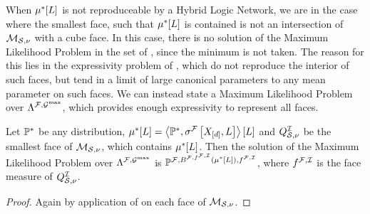 When $\mu^*[L]$ is not reproduceable by a Hybrid Logic Network, we are in the case where the smallest face, such that $\mu^*[L]$ is contained is not an intersection of $\mathcal{M}_{\mathcal{S},\nu}$ with a cube face.
In this case, there is no solution of the Maximum Likelihood Problem  in the set of \HybridLogicNetworks{}, since the minimum is not taken.
The reason for this lies in the expressivity problem of \HybridLogicNetworks{}, which do not reproduce the interior of such faces, but tend in a limit of large canonical parameters to any mean parameter on such faces.
We can instead state a Maximum Likelihood Problem over $\Lambda^{\mathcal{F},\mathcal{G}^{\mathrm{max}}}$, which provides enough expressivity to represent all faces.

\begin{theorem}
    Let $\mathbb{P}^*$ be any distribution, $\mu^*[L]=\left\langle \mathbb{P}^*,\sigma^{\mathcal{F}}\left[X_{[d]},L\right]\right\rangle \left[ L \right]$ and $Q^{\mathcal{I}}_{\mathcal{S},\nu}$ be the smallest face of $\mathcal{M}_{\mathcal{S},\nu}$, which contains $\mu^*[L]$.
    Then the solution of the Maximum Likelihood Problem  over $\Lambda^{\mathcal{F},\mathcal{G}^{\mathrm{max}}}$ is $\mathbb{P}^{\mathcal{F},B^{\mathcal{F},f^{\mathcal{F},\mathcal{I}}}(\mu^*[L]),f^{\mathcal{F},\mathcal{I}}}$, where $f^{\mathcal{F},\mathcal{I}}$ is the face measure of $Q^{\mathcal{I}}_{\mathcal{S},\nu}$.
\end{theorem}
\begin{proof}
    Again by application of  on each face of $\mathcal{M}_{\mathcal{S},\nu}$.
\end{proof}


